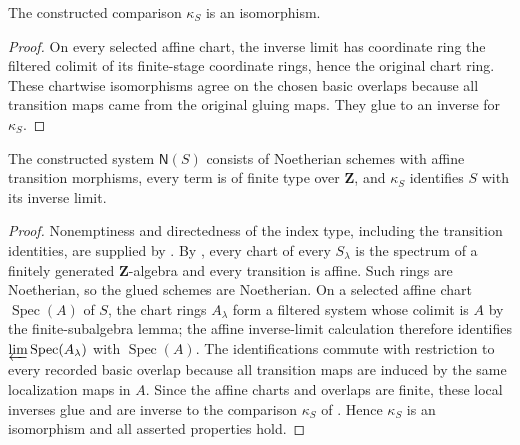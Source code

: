 \begin{lemma}
  \label{lemma:nagata-glued-limit-recovery}

  The constructed comparison $\kappa_S$ is an isomorphism.
\end{lemma}

\begin{proof}
  On every selected affine chart, the inverse limit has coordinate ring the
  filtered colimit of its finite-stage coordinate rings, hence the original
  chart ring.  These chartwise isomorphisms agree on the chosen basic
  overlaps because all transition maps came from the original gluing maps.
  They glue to an inverse for $\kappa_S$.
\end{proof}

\begin{proposition}
  \label{prop:nagata-noetherian-inverse-system}

  The constructed system $\mathsf N(S)$ consists of Noetherian schemes with
  affine transition morphisms, every term is of finite type over
  $\mathbf Z$, and $\kappa_S$ identifies $S$ with its inverse limit.
\end{proposition}

\begin{proof}
  Nonemptiness and directedness of the index type, including the transition
  identities, are supplied by
  .  By
  , every chart of every $S_\lambda$
  is the spectrum of a finitely generated $\mathbf Z$-algebra and every
  transition is affine.  Such rings are Noetherian, so the glued schemes are
  Noetherian.  On a selected affine chart $\operatorname{Spec}(A)$ of $S$,
  the chart rings $A_\lambda$ form a filtered system whose colimit is $A$ by
  the finite-subalgebra lemma; the affine inverse-limit calculation therefore
  identifies $\varprojlim\operatorname{Spec}(A_\lambda)$ with
  $\operatorname{Spec}(A)$.  The identifications commute with restriction to
  every recorded basic overlap because all transition maps are induced by the
  same localization maps in $A$.  Since the affine charts and overlaps are
  finite, these local inverses glue and are inverse to the comparison
  $\kappa_S$ of .  Hence $\kappa_S$ is
  an isomorphism and all asserted properties hold.
\end{proof}


